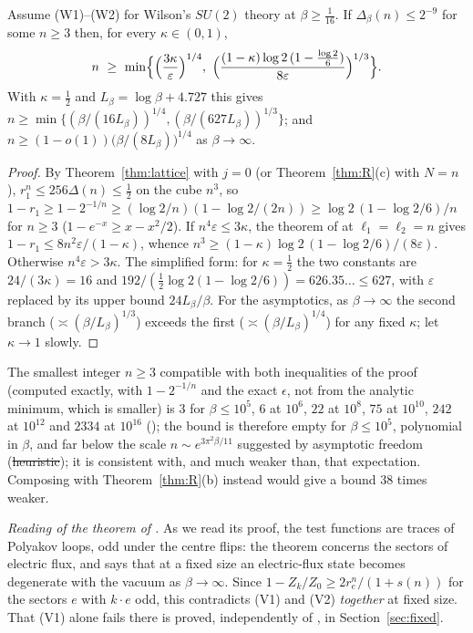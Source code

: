 \begin{proposition}\label{prop:scale}
Assume (W1)--(W2) for Wilson's $SU(2)$ theory at $\beta\ge\frac1{16}$. If $\Delta_\beta(n)\le2^{-9}$ for some $n\ge3$ then, for every $\kappa\in(0,1)$,
\[
n\ \ge\ \min\Bigl\{\Bigl(\frac{3\kappa}{\varepsilon}\Bigr)^{1/4},\ \Bigl(\frac{(1-\kappa)\log2\,(1-\frac{\log2}6)}{8\varepsilon}\Bigr)^{1/3}\Bigr\}.
\]
With $\kappa=\frac12$ and $L_\beta=\log\beta+4.727$ this gives $n\ge\min\{(\beta/(16L_\beta))^{1/4},(\beta/(627L_\beta))^{1/3}\}$; and $n\ge(1-o(1))\bigl(\beta/(8L_\beta)\bigr)^{1/4}$ as $\beta\to\infty$.
\end{proposition}
\begin{proof}
By Theorem~\ref{thm:lattice} with $j=0$ (or Theorem~\ref{thm:R}(c) with $N=n$), $r_1^n\le256\Delta(n)\le\frac12$ on the cube $n^3$, so $1-r_1\ge1-2^{-1/n}\ge(\log2/n)(1-\log2/(2n))\ge\log2\,(1-\log2/6)/n$ for $n\ge3$ ($1-e^{-x}\ge x-x^2/2$). If $n^4\varepsilon\le3\kappa$, the theorem of \cite{BB26v5} at $\ell_1=\ell_2=n$ gives $1-r_1\le8n^2\varepsilon/(1-\kappa)$, whence $n^3\ge(1-\kappa)\log2\,(1-\log2/6)/(8\varepsilon)$. Otherwise $n^4\varepsilon>3\kappa$. The simplified form: for $\kappa=\frac12$ the two constants are $24/(3\kappa)=16$ and $192/(\frac12\log2(1-\log2/6))=626.35\ldots\le627$, with $\varepsilon$ replaced by its upper bound $24L_\beta/\beta$. For the asymptotics, as $\beta\to\infty$ the second branch ($\asymp(\beta/L_\beta)^{1/3}$) exceeds the first ($\asymp(\beta/L_\beta)^{1/4}$) for any fixed $\kappa$; let $\kappa\to1$ slowly.
\end{proof}
The smallest integer $n\ge3$ compatible with both inequalities of the proof (computed exactly, with $1-2^{-1/n}$ and the exact $\epsilon$, not from the analytic minimum, which is smaller) is $3$ for $\beta\le10^5$, $6$ at $10^6$, $22$ at $10^8$, $75$ at $10^{10}$, $242$ at $10^{12}$ and $2334$ at $10^{16}$ (); the bound is therefore empty for $\beta\le10^5$, polynomial in $\beta$, and far below the scale $n\sim e^{3\pi^2\beta/11}$ suggested by asymptotic freedom (\st{heuristic}); it is consistent with, and much weaker than, that expectation. Composing \cite[Cor.~7.60]{BB26v5} with Theorem~\ref{thm:R}(b) instead would give a bound $38$ times weaker.

\emph{Reading of the theorem of \cite{BB26v5}.} As we read its proof, the test functions are traces of Polyakov loops, odd under the centre flips: the theorem concerns the sectors of electric flux, and says that at a fixed size an electric-flux state becomes degenerate with the vacuum as $\beta\to\infty$. Since $1-Z_k/Z_0\ge2r_e^n/(1+s(n))$ for the sectors $e$ with $k\cdot e$ odd, this contradicts (V1) and (V2) \emph{together} at fixed size. That (V1) alone fails there is proved, independently of \cite{BB26v5}, in Section~\ref{sec:fixed}.
